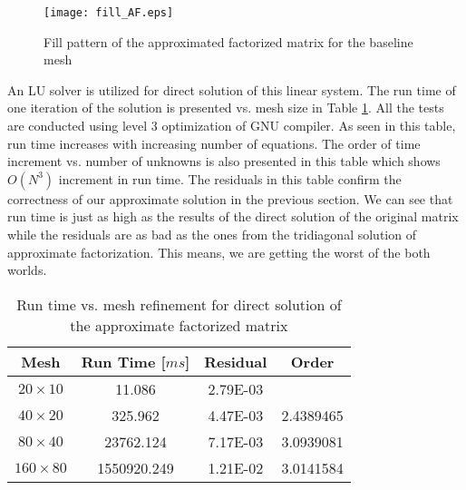 \documentclass{article}
\begin{document}
\begin{figure}[H]
\centering
\texttt{[image: fill\_AF.eps]}
\caption{Fill pattern of the approximated factorized matrix for the baseline mesh}
\label{fig_fill_AF_1}
\end{figure}

An LU solver is utilized for direct solution of this linear system. The run time of one iteration of the solution is presented vs. mesh size in Table \ref{table_AF_direct_1}. All the tests are conducted using level 3 optimization of GNU compiler. As seen in this table, run time increases with increasing number of equations. The order of time increment vs. number of unknowns is also presented in this table which shows $O(N^3)$ increment in run time. The residuals in this table confirm the correctness of our approximate solution in the previous section. We can see that run time is just as high as the results of the direct solution of the original matrix while the residuals are as bad as the ones from the tridiagonal solution of approximate factorization. This means, we are getting the worst of the both worlds.

\begin{table}[H]
\centering
\caption{Run time vs. mesh refinement for direct solution of the approximate factorized matrix}
\label{table_AF_direct_1}
\begin{tabular}{cccc}
\hline
Mesh & Run Time [$m s$] & Residual & Order\\
\hline\hline
$20 \times 10$  & 11.086      & 2.79E-03 &           \\
$40 \times 20$  & 325.962     & 4.47E-03 & 2.4389465 \\
$80 \times 40$  & 23762.124   & 7.17E-03 & 3.0939081 \\
$160 \times 80$ & 1550920.249 & 1.21E-02 & 3.0141584 \\
\hline
\end{tabular}
\end{table}
\end{document}

